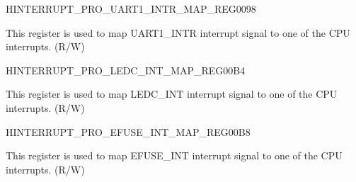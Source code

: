 \begin{register}{H}{INTERRUPT\_PRO\_UART1\_INTR\_MAP\_REG}{\hexprefix{}0098}\label{regdesc:INTERRUPTPROUART1INTRMAPREG}
%
%
\regnewline%
\begin{regdesc}\begin{reglist}
\label{fielddesc:INTERRUPTPROUART1INTRMAP}\item [INTERRUPT\_PRO\_UART1\_INTR\_MAP] This register is used to map UART1\_INTR interrupt signal to one of the CPU interrupts. (R/W)
\end{reglist}\end{regdesc}
\end{register}














\begin{register}{H}{INTERRUPT\_PRO\_LEDC\_INT\_MAP\_REG}{\hexprefix{}00B4}\label{regdesc:INTERRUPTPROLEDCINTMAPREG}
%
%
\regnewline%
\begin{regdesc}\begin{reglist}
\label{fielddesc:INTERRUPTPROLEDCINTMAP}\item [INTERRUPT\_PRO\_LEDC\_INT\_MAP] This register is used to map LEDC\_INT interrupt signal to one of the CPU interrupts. (R/W)
\end{reglist}\end{regdesc}
\end{register}


\begin{register}{H}{INTERRUPT\_PRO\_EFUSE\_INT\_MAP\_REG}{\hexprefix{}00B8}\label{regdesc:INTERRUPTPROEFUSEINTMAPREG}
%
%
\regnewline%
\begin{regdesc}\begin{reglist}
\label{fielddesc:INTERRUPTPROEFUSEINTMAP}\item [INTERRUPT\_PRO\_EFUSE\_INT\_MAP] This register is used to map EFUSE\_INT interrupt signal to one of the CPU interrupts. (R/W)
\end{reglist}\end{regdesc}
\end{register}


